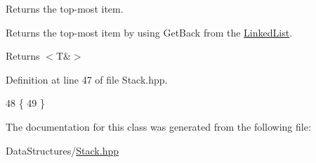Returns the top-\/most item. 

Returns the top-\/most item by using Get\+Back from the \hyperlink{classLinkedList}{Linked\+List}.

\begin{DoxyReturn}{Returns}
$<$T\&$>$ 
\end{DoxyReturn}


Definition at line 47 of file Stack.\+hpp.


\begin{DoxyCode}
48     \{
49     \}
\end{DoxyCode}


The documentation for this class was generated from the following file\+:\begin{DoxyCompactItemize}
\item 
Data\+Structures/\hyperlink{Stack_8hpp}{Stack.\+hpp}\end{DoxyCompactItemize}

